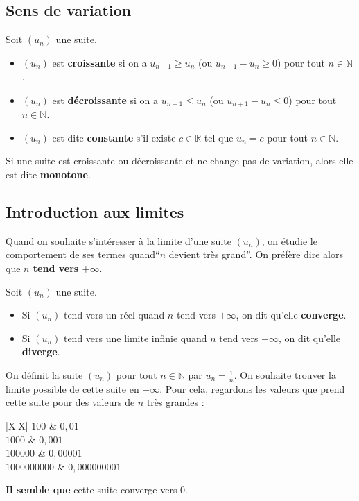 	\subsection{Sens de variation}
	
	\begin{formula}[Définition]
		Soit $(u_n)$ une suite.
		\begin{itemize}
			\item $(u_n)$ est \textbf{croissante} si on a $u_{n+1} \geq u_n$ (ou $u_{n+1} - u_n \geq 0$) pour tout $n \in \mathbb{N}$.
			\item $(u_n)$ est \textbf{décroissante} si on a $u_{n+1} \leq u_n$ (ou $u_{n+1} - u_n \leq 0$) pour tout $n \in \mathbb{N}$.
			\item $(u_n)$ est dite \textbf{constante} s'il existe $c \in \mathbb{R}$ tel que $u_n = c$ pour tout $n \in \mathbb{N}$.
		\end{itemize}
	\end{formula}
	
	Si une suite est croissante ou décroissante et ne change pas de variation, alors elle est dite \textbf{monotone}.
	
	\subsection{Introduction aux limites}
	
	Quand on souhaite s'intéresser à la limite d'une suite $(u_n)$, on étudie le comportement de ses termes quand``$n$ devient très grand''. On préfère dire alors que \textbf{$n$ tend vers $+\infty$}.
	
	\begin{formula}[Définition]
		Soit $(u_n)$ une suite.
		\begin{itemize}
			\item Si $(u_n)$ tend vers un réel quand $n$ tend vers $+\infty$, on dit qu'elle \textbf{converge}.
			\item Si $(u_n)$ tend vers une limite infinie quand $n$ tend vers $+\infty$, on dit qu'elle \textbf{diverge}.
		\end{itemize}
	\end{formula}
	
	\begin{tip}[Exemple]
		On définit la suite $(u_n)$ pour tout $n \in \mathbb{N}$ par $u_n = \frac{1}{n}$. On souhaite trouver la limite possible de cette suite en $+ \infty$.
		\newline
		Pour cela, regardons les valeurs que prend cette suite pour des valeurs de $n$ très grandes :
		\newpar
		\begin{whitetabularx}{|X|X|}
			\hline
			$100$ & $0,01$ \\
			\hline
			$1 000$ & $0,001$ \\
			\hline
			$100 000$ & $0,000 01$ \\
			\hline
			$1 000 000 000$ & $0,000 000 001$ \\
			\hline
		\end{whitetabularx}
		\newpar
		\textbf{Il semble que} cette suite converge vers 0.
	\end{tip}
	
